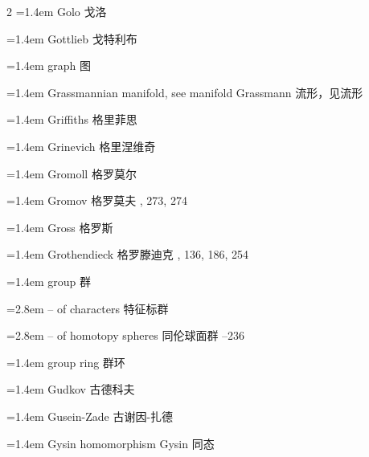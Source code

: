 \begin{multicols}{2}
\noindent\hangindent=1.4em Golo \quad 戈洛 \par
\noindent\hangindent=1.4em Gottlieb \quad 戈特利布 \par
\noindent\hangindent=1.4em graph \quad 图 \par
\noindent\hangindent=1.4em Grassmannian manifold, see manifold \quad Grassmann 流形，见流形 \quad\par
\noindent\hangindent=1.4em Griffiths \quad 格里菲思 \par
\noindent\hangindent=1.4em Grinevich \quad 格里涅维奇 \par
\noindent\hangindent=1.4em Gromoll \quad 格罗莫尔 \par
\noindent\hangindent=1.4em Gromov \quad 格罗莫夫 , 273, 274\par
\noindent\hangindent=1.4em Gross \quad 格罗斯 \par
\noindent\hangindent=1.4em Grothendieck \quad 格罗滕迪克 , 136, 186, 254\par
\noindent\hangindent=1.4em group \quad 群 \quad\par
\noindent\hangindent=2.8em -- of characters \quad 特征标群 \par
\noindent\hangindent=2.8em -- of homotopy spheres \quad 同伦球面群 --236\par
\noindent\hangindent=1.4em group ring \quad 群环 \par
\noindent\hangindent=1.4em Gudkov \quad 古德科夫 \par
\noindent\hangindent=1.4em Gusein-Zade \quad 古谢因-扎德 \par
\noindent\hangindent=1.4em Gysin homomorphism \quad Gysin 同态 \par
\end{multicols}

